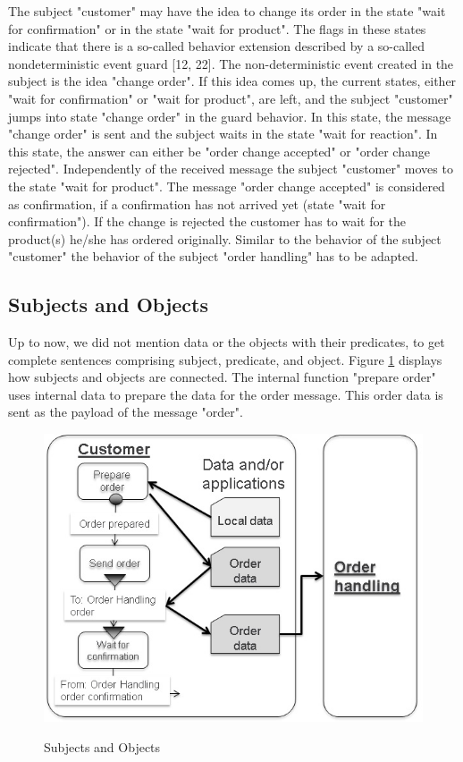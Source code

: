 The subject "customer" may have the idea to change its order in the state "wait for confirmation" or in the state "wait for product". The flags in these states indicate that there is a so-called behavior extension described by a so-called nondeterministic event guard [12, 22]. The non-deterministic event created in the subject is the idea "change order". If this idea comes up, the current states, either "wait for confirmation" or "wait for product", are left, and the subject "customer" jumps into state "change order" in the guard behavior. In this state, the message "change order" is sent and the subject waits in the state "wait for reaction". In this state, the answer can either be "order change accepted" or "order change rejected". Independently of the received message the subject "customer" moves to the state "wait for product". The message "order change accepted" is considered as confirmation, if a confirmation has not arrived yet (state "wait for confirmation"). If the change is rejected the customer has to wait for the product(s) he/she has ordered originally. Similar to the behavior of the subject "customer" the behavior of the subject "order handling" has to be adapted.

\subsection{Subjects and Objects}
\label{SUbjects-Objects}

Up to now, we did not mention data or the objects with their predicates, to get complete sentences comprising subject, predicate, and object. Figure \ref{fig:subjectobject} displays how subjects and objects are connected. The internal function "prepare order" uses internal data to prepare the data for the order message. This order data is sent as the payload of the message "order".

\begin{figure}[htbp]
	\centering
	\includegraphics[width=0.9\linewidth]{Figures/Ontology/SubjectExecution/SUbjectObject}
	\label{fig:subjectobject}
	\caption[Subjects and Objects]{Subjects and Objects}
\end{figure}

